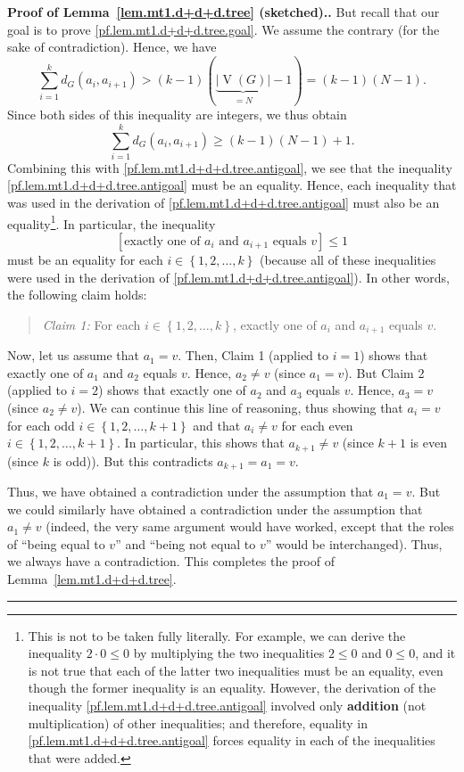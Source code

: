 \documentclass[numbers=enddot,12pt,final,onecolumn,notitlepage]{scrartcl}%
\theoremstyle{definition}
\newenvironment{statement}{\begin{quote}}{\end{quote}}
\newenvironment{proof}[1][Proof]{\noindent\textbf{#1.} }{\ \rule{0.5em}{0.5em}}
\let\sumnonlimits\sum
\renewcommand{\sum}{\sumnonlimits\limits}
\newcommand{\set}[1]{\left\{ #1 \right\}}
\newcommand{\abs}[1]{\left| #1 \right|}
\newcommand{\tup}[1]{\left( #1 \right)}
\newcommand{\ive}[1]{\left[ #1 \right]}
\newcommand{\verts}[1]{\operatorname{V}\left( #1 \right)}
\newcommand{\underbrack}[2]{\underbrace{#1}_{\substack{#2}}}
\begin{document}
\begin{proof}[Proof of Lemma~\ref{lem.mt1.d+d+d.tree} (sketched).]
But recall that our goal is to prove
\eqref{pf.lem.mt1.d+d+d.tree.goal}. We assume the contrary (for the
sake of contradiction). Hence, we have
\[
\sum_{i=1}^k d_G \tup{a_i, a_{i+1}}
> \tup{k-1} \tup{\underbrack{\abs{\verts{G}}}{= N} -1}
= \tup{k-1} \tup{N-1} .
\]
Since both sides of this
inequality are integers, we thus obtain
\[
\sum_{i=1}^k d_G \tup{a_i, a_{i+1}}
\geq \tup{k-1} \tup{N-1} + 1.
\]
Combining this with \eqref{pf.lem.mt1.d+d+d.tree.antigoal}, we see
that the inequality \eqref{pf.lem.mt1.d+d+d.tree.antigoal} must be an
equality. Hence, each inequality that was used in the derivation of
\eqref{pf.lem.mt1.d+d+d.tree.antigoal} must also be an
equality\footnote{This is not to be taken fully literally. For
example, we can derive the inequality $2\cdot 0 \leq 0$ by multiplying
the two inequalities $2 \leq 0$ and $0 \leq 0$, and it is not true
that each of the latter two inequalities must be an equality, even
though the former inequality is an equality.
However, the derivation of the inequality
\eqref{pf.lem.mt1.d+d+d.tree.antigoal} involved only
\textbf{addition} (not multiplication) of other inequalities; and
therefore, equality in \eqref{pf.lem.mt1.d+d+d.tree.antigoal} forces
equality in each of the inequalities that were added.}.
In particular, the inequality
\[
\ive{\text{exactly one of } a_i \text{ and } a_{i+1}
                     \text{ equals } v } \leq 1
\]
must be an equality for each $i \in \set{1, 2, \ldots, k}$ (because
all of these inequalities were used in the derivation of
\eqref{pf.lem.mt1.d+d+d.tree.antigoal}). In other words, the following
claim holds:
\begin{statement}
\textit{Claim 1:} For each $i \in \set{1, 2, \ldots, k}$, exactly one
of $a_i$ and $a_{i+1}$ equals $v$.
\end{statement}

Now, let us assume that $a_1 = v$. Then, Claim 1 (applied to $i=1$)
shows that exactly one of $a_1$ and $a_2$ equals $v$. Hence, $a_2 \neq
v$ (since $a_1 = v$). But Claim 2 (applied to $i=2$) shows that
exactly one of $a_2$ and $a_3$ equals $v$. Hence, $a_3 = v$ (since
$a_2 \neq v$). We can continue this line of reasoning, thus showing
that $a_i = v$ for each odd $i \in \set{1, 2, \ldots, k+1}$ and that
$a_i \neq v$ for each even $i \in \set{1, 2, \ldots, k+1}$.
In particular, this shows that $a_{k+1} \neq v$ (since $k+1$ is even
(since $k$ is odd)).
But this contradicts $a_{k+1} = a_1 = v$.

Thus, we have obtained a contradiction under the assumption that
$a_1 = v$. But we could similarly have obtained a contradiction under
the assumption that $a_1 \neq v$ (indeed, the very same argument would
have worked, except that the roles of ``being equal to $v$'' and
``being not equal to $v$'' would be interchanged). Thus, we always
have a contradiction. This completes the proof of
Lemma~\ref{lem.mt1.d+d+d.tree}.
\end{proof}
\end{document}
